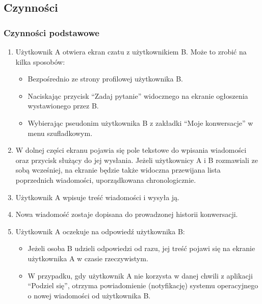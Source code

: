 \documentclass[12pt,a4paper,twoside]{article}
\begin{document}
    \subsection{Czynności}


    \subsubsection{Czynności podstawowe}


    \begin{enumerate}
        \item Użytkownik A otwiera ekran czatu z użytkownikiem B. Może to zrobić na kilka sposobów:
        \begin{itemize}
            \item Bezpośrednio ze strony profilowej użytkownika B.
            \item Naciskając przycisk ``Zadaj pytanie'' widocznego na ekranie ogłoszenia wystawionego przez B.
            \item Wybierając pseudonim użytkownika B z zakładki ``Moje konwersacje'' w menu szufladkowym.
        \end{itemize}
        \item W dolnej części ekranu pojawia się pole tekstowe do wpisania wiadomości oraz przycisk służący do jej wysłania. Jeżeli użytkownicy A i B rozmawiali ze sobą wcześniej, na ekranie będzie także widoczna przewijana lista poprzednich wiadomości, uporządkowana chronologicznie.
        \item Użytkownik A wpisuje treść wiadomości i wysyła ją.
        \item Nowa wiadomość zostaje dopisana do prowadzonej historii konwersacji.
        \item Użytkownik A oczekuje na odpowiedź użytkownika B:\@
        \begin{itemize}
            \item Jeżeli osoba B udzieli odpowiedzi od razu, jej treść pojawi się na ekranie użytkownika A w czasie rzeczywistym.
            \item W przypadku, gdy użytkownik A nie korzysta w danej chwili z aplikacji ``Podziel się'', otrzyma powiadomienie (notyfikację) systemu operacyjnego o nowej wiadomości od użytkownika B.
        \end{itemize}
    \end{enumerate}
\end{document}
